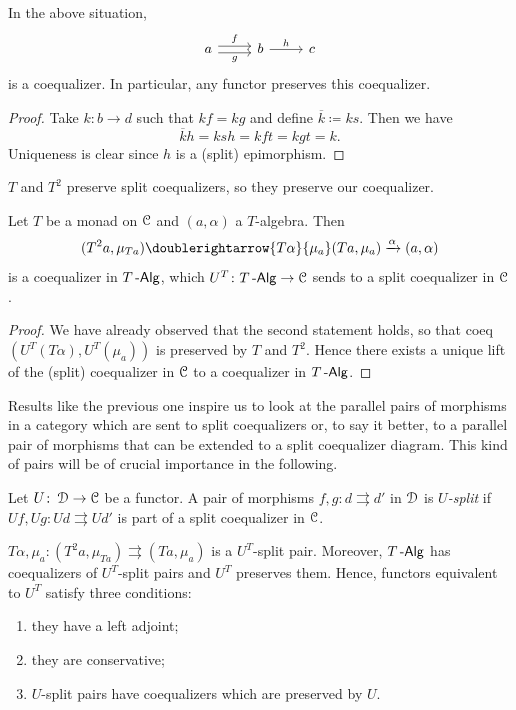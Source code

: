 \documentclass[a4paper,11pt,oneside,openany]{scrbook}
\begin{document}
\begin{prop}
In the above situation, 
\[
\begin{tikzcd}[ampersand replacement=\&]
a\arrow[r, shift left, "f"] \arrow[r, shift right, "g"']
\& b \arrow[r, "h"] \& c 
\end{tikzcd}
\] is a coequalizer. In particular, any functor preserves this coequalizer.
\end{prop}
\begin{proof}
Take $k\colon b\to d$ such that $kf=kg$ and define $\overline{k}\coloneqq ks$. Then we have
$$\overline{k}h=ksh=kft=kgt=k.$$
Uniqueness is clear since $h$ is a (split) epimorphism. 
\end{proof}
$T$ and $T^2$ preserve split coequalizers, so they preserve our coequalizer.
\begin{cor}
Let $T$ be a monad on $\operatorname{\mathcal{C}}$ and $(a,\alpha)$ a $T$-algebra. Then 
\[
(T^2a,\mu_{Ta}) \doublerightarrow{T\alpha}{\mu_a}(Ta,\mu_a)\xrightarrow{\alpha}(a,\alpha)
\]
is a coequalizer in $T\operatorname{-\mathsf{Alg}}$, which $U^T\colon T\operatorname{-\mathsf{Alg}}\to\operatorname{\mathcal{C}}$ sends to a split coequalizer in $\operatorname{\mathcal{C}}$.
\end{cor}
\begin{proof}
We have already observed that the second statement holds, so that coeq$(U^T(T\alpha), U^T(\mu_a))$ is preserved by $T$ and $T^2$. Hence there exists a unique lift of the (split) coequalizer in $\operatorname{\mathcal{C}}$ to a coequalizer in $T\operatorname{-\mathsf{Alg}}$. 
\end{proof}
Results like the previous one inspire us to look at the parallel pairs of morphisms in a category which are sent to split coequalizers or, to say it better, to a parallel pair of morphisms that can be extended to a split coequalizer diagram. This kind of pairs will be of crucial importance in the following.
\begin{defn}
Let $U\colon\operatorname{\mathcal{D}}\to\operatorname{\mathcal{C}}$ be a functor. A pair of morphisms $f,g\colon d\rightrightarrows d'$ in $\operatorname{\mathcal{D}}$ is \emph{$U$-split} if $Uf,Ug\colon Ud\rightrightarrows Ud'$ is part of a split coequalizer in $\operatorname{\mathcal{C}}$.
\end{defn} 
\begin{rmk}
$T\alpha,\mu_a\colon(T^2a,\mu_{Ta})\rightrightarrows(Ta,\mu_a)$ is a $U^T$-split pair. Moreover, $T\operatorname{-\mathsf{Alg}}$ has coequalizers of $U^T$-split pairs and $U^T$ preserves them. Hence, functors equivalent to $U^T$ satisfy three conditions:
\begin{enumerate}
	\item they have a left adjoint;
	\item they are conservative;
	\item $U$-split pairs have coequalizers which are preserved by $U$.
\end{enumerate}
\end{rmk}
\end{document}
